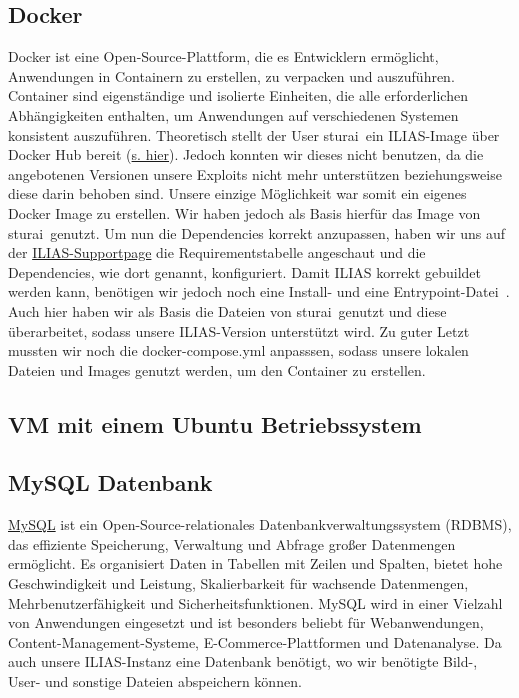 \documentclass[10pt, a4paper,onecolumn ,titlepage]{article}
\begin{document}
    \subsection{Docker}
    \label{subsec:docker}
    Docker ist eine Open-Source-Plattform, die es Entwicklern ermöglicht, Anwendungen in Containern zu erstellen, zu verpacken und auszuführen.
    Container sind eigenständige und isolierte Einheiten, die alle erforderlichen Abhängigkeiten enthalten, um Anwendungen auf verschiedenen Systemen konsistent auszuführen.\parencite{docker}
    Theoretisch stellt der User \glqq sturai\grqq\ ein ILIAS-Image über Docker Hub bereit (\href{https://hub.docker.com/r/sturai/ilias#!}{s. hier}).
    Jedoch konnten wir dieses nicht benutzen, da die angebotenen Versionen unsere Exploits nicht mehr unterstützen beziehungsweise diese darin behoben sind.
    Unsere einzige Möglichkeit war somit ein eigenes Docker Image zu erstellen. Wir haben jedoch als Basis hierfür das Image von \glqq sturai\grqq\ genutzt.
    Um nun die Dependencies korrekt anzupassen, haben wir uns auf der \href{https://docu.ilias.de/goto_docu_lm_367.html}{ILIAS-Supportpage} die Requirementstabelle angeschaut und die Dependencies, wie dort genannt, konfiguriert.
    Damit ILIAS korrekt gebuildet werden kann, benötigen wir jedoch noch eine Install- und eine Entrypoint-Datei~\parencite{dockerEntrypoints}.
    Auch hier haben wir als Basis die Dateien von \glqq sturai\grqq\ genutzt und diese überarbeitet, sodass unsere ILIAS-Version unterstützt wird.
    Zu guter Letzt mussten wir noch die docker-compose.yml anpasssen, sodass unsere lokalen Dateien und Images genutzt werden, um den Container zu erstellen.

    \subsection{VM mit einem Ubuntu Betriebssystem}
    \label{subsec:ubuntu}

    \subsection{MySQL Datenbank}
    \label{subsec:mysqlDatenbank}
    \href{https://www.mysql.com/}{MySQL} ist ein Open-Source-relationales Datenbankverwaltungssystem (RDBMS), das effiziente Speicherung, Verwaltung und Abfrage großer Datenmengen ermöglicht.
    Es organisiert Daten in Tabellen mit Zeilen und Spalten, bietet hohe Geschwindigkeit und Leistung, Skalierbarkeit für wachsende Datenmengen, Mehrbenutzerfähigkeit und Sicherheitsfunktionen.
    MySQL wird in einer Vielzahl von Anwendungen eingesetzt und ist besonders beliebt für Webanwendungen, Content-Management-Systeme, E-Commerce-Plattformen und Datenanalyse.
    Da auch unsere ILIAS-Instanz eine Datenbank benötigt, wo wir benötigte Bild-, User- und sonstige Dateien abspeichern können.
\end{document}
